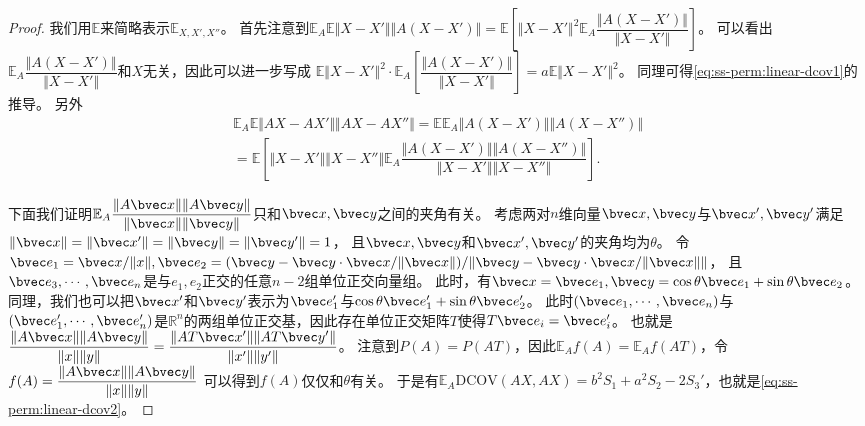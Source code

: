 \begin{proof}
我们用$\mathbb E$来简略表示$\mathbb E_{X,X',X''}$。
%
首先注意到$\mathbb E_A\mathbb E\Vert X - X' \Vert \Vert A(X - X') \Vert = \mathbb E \left[ \Vert X - X'\Vert^2 \mathbb E_A \dfrac{\Vert A(X - X') \Vert }{\Vert X - X'\Vert} \right]$。
%
可以看出$\mathbb E_A \dfrac{\Vert A(X - X') \Vert }{\Vert X - X'\Vert}$和$X$无关，因此可以进一步写成
$\mathbb E \Vert X - X'\Vert^2 \cdot \mathbb E_A \left[ \dfrac{\Vert A(X - X') \Vert }{\Vert X - X'\Vert} \right] = a\mathbb E \Vert X - X'\Vert^2$。
%
同理可得\autoref{eq:ss-perm:linear-dcov1}的推导。
另外
\begin{equation}
\begin{split}
    \mathbb E_A \mathbb E{\Vert AX - AX' \Vert \Vert AX - AX'' \Vert} = 
    \mathbb E \mathbb E_A \Vert A(X - X') \Vert \Vert A(X - X'') \Vert \\
    =
    \mathbb E \left[ \Vert X - X' \Vert \Vert X - X'' \Vert \mathbb E_A \dfrac{\Vert A(X - X') \Vert \Vert A(X - X'') \Vert}{\Vert X - X' \Vert \Vert X - X'' \Vert}  \right].
\end{split}
\end{equation}

下面我们证明$\mathbb E_A \dfrac{\Vert A\bvec x\Vert \Vert A \bvec y\Vert }{\Vert \bvec x \Vert \Vert \bvec y \Vert}$只和$\bvec x, \bvec y$之间的夹角有关。
%
考虑两对$n$维向量$\bvec x, \bvec y$与$\bvec x', \bvec y'$满足$\Vert \bvec x \Vert = \Vert \bvec x' \Vert = \Vert \bvec y \Vert = \Vert \bvec y' \Vert = 1$，
且$\bvec x, \bvec y$和$\bvec x', \bvec y'$的夹角均为$\theta$。
%
令$\bvec e_1 = \bvec x/\Vert x \Vert, \bvec e_2 = (\bvec y - \bvec y \cdot \bvec x/\Vert \bvec x \Vert) / \Vert \bvec y - \bvec y \cdot \bvec x/\Vert \bvec x \Vert \Vert$，
且$\bvec e_3, \cdots, \bvec e_n$是与$e_1, e_2$正交的任意$n-2$组单位正交向量组。
%
此时，有$\bvec x = \bvec e_1, \bvec y = \cos \theta \bvec e_1 + \sin \theta \bvec e_2$。
%
同理，我们也可以把$\bvec x'$和$\bvec y'$表示为$\bvec e_1'$与$\cos \theta \bvec e'_1 + \sin \theta \bvec e'_2$。
%
此时$(\bvec e_1, \cdots, \bvec e_n)$与$(\bvec e'_1, \cdots, \bvec e'_n)$是$\mathbb R^n$的两组单位正交基，因此存在单位正交矩阵$T$使得$T\bvec e_i = \bvec e'_i$。
%
也就是$\dfrac{\Vert A\bvec x \Vert\Vert A\bvec y \Vert}{\Vert x\Vert \Vert y \Vert} = \dfrac{\Vert AT\bvec x' \Vert\Vert AT\bvec y' \Vert}{\Vert x'\Vert \Vert y' \Vert}$。
%
注意到$P(A)=P(AT)$，因此$\mathbb E_A f(A) = \mathbb E_A f(AT)$，令$f(A) = \dfrac{\Vert A\bvec x \Vert\Vert A\bvec y \Vert}{\Vert x\Vert \Vert y \Vert}$ 可以得到$f(A)$仅仅和$\theta$有关。
%
于是有$\mathbb E_A \text{DCOV}(AX, AX) = b^2 S_1 + a^2 S_2 - 2S_3'$，也就是\autoref{eq:ss-perm:linear-dcov2}。
\end{proof}

